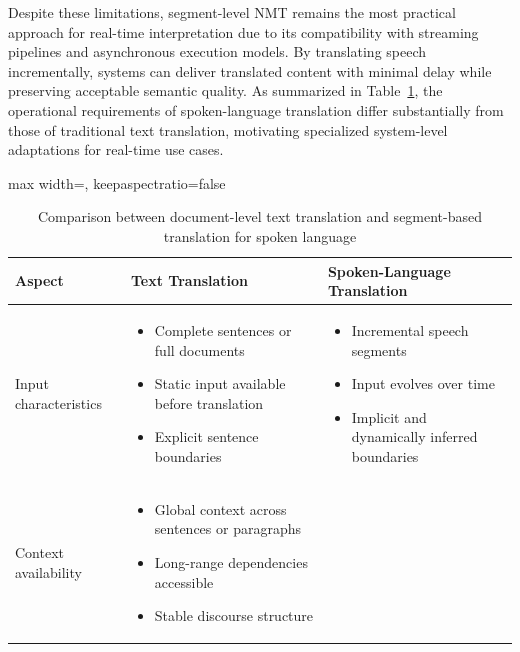 Despite these limitations, segment-level NMT remains the most practical approach for real-time interpretation due to its compatibility with streaming pipelines and asynchronous execution models. By translating speech incrementally, systems can deliver translated content with minimal delay while preserving acceptable semantic quality. As summarized in Table~\ref{tab:nmt_text_vs_speech}, the operational requirements of spoken-language translation differ substantially from those of traditional text translation, motivating specialized system-level adaptations for real-time use cases.


\begin{table}[!htbp]
  \centering
  \caption[Text translation and segment-based translation comparison]{Comparison between document-level text translation and segment-based translation for spoken language}
  \label{tab:nmt_text_vs_speech}
  \begin{adjustbox}{max width=\textwidth, keepaspectratio=false}
    \begin{tabular}{p{4.3cm} p{7.5cm} p{7.5cm}}
      \toprule
      \textbf{Aspect} & \textbf{Text Translation} & \textbf{Spoken-Language Translation} \\
      \midrule
      Input characteristics 
      &
      \begin{itemize}[nosep,leftmargin=*]
        \item Complete sentences or full documents
        \item Static input available before translation
        \item Explicit sentence boundaries
      \end{itemize}
      &
      \begin{itemize}[nosep,leftmargin=*]
        \item Incremental speech segments
        \item Input evolves over time
        \item Implicit and dynamically inferred boundaries
      \end{itemize} \\
      \midrule
      Context availability 
      &
      \begin{itemize}[nosep,leftmargin=*]
        \item Global context across sentences or paragraphs
        \item Long-range dependencies accessible
        \item Stable discourse structure
      \end{itemize}

\end{tabular}
\end{adjustbox}
\end{table}
